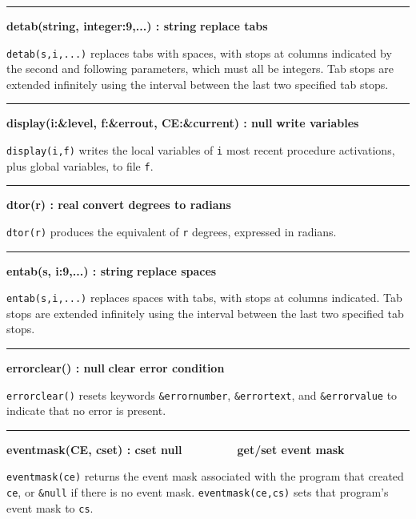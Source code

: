 \bigskip\hrule\vspace{0.1cm}
\noindent
{\bf detab(string, integer:9,...) : string } \hfill {\bf replace tabs}

\noindent
\texttt{detab(s,i,...)} replaces tabs with spaces, with stops at columns
indicated by the second and following parameters, which must all be
integers. Tab stops are extended infinitely using the interval between
the last two specified tab stops.

\bigskip\hrule\vspace{0.1cm}
\noindent
{\bf display(i:\&level, f:\&errout, CE:\&current) : null } \hfill {\bf write variables}

\noindent
{}\texttt{display(i,f)} writes the local variables
of \texttt{i} most recent procedure activations, plus global
variables, to file \texttt{f}.

\bigskip\hrule\vspace{0.1cm}
\noindent
{\bf dtor(r) : real } \hfill {\bf convert degrees to radians}

\noindent
{}\texttt{dtor(r)}
produces the equivalent of \texttt{r} degrees, expressed in radians.

\bigskip\hrule\vspace{0.1cm}
\noindent
{\bf entab(s, i:9,...) : string } \hfill {\bf replace spaces}

\noindent
\texttt{entab(s,i,...)} replaces spaces with tabs, with stops at columns
indicated. Tab stops are extended infinitely using the interval between
the last two specified tab stops.

\bigskip\hrule\vspace{0.1cm}
\noindent
{\bf errorclear() : null } \hfill {\bf clear error condition}

\noindent
{}\texttt{errorclear()} resets keywords
\texttt{\&errornumber}, \texttt{\&errortext}, and
\texttt{\&errorvalue} to indicate that no error is present.

\bigskip\hrule\vspace{0.1cm}
\noindent
{\bf eventmask(CE, cset) : cset {\textbar} null } \hfill {\bf \ \ \ \ \ \ \ \  get/set event mask}

\noindent
{}\texttt{eventmask(ce)} returns the event mask associated
with the program that created \texttt{ce}, or \texttt{\&null} if there
is no event mask. \texttt{eventmask(ce,cs)} sets that program's event
mask to \texttt{cs}.


